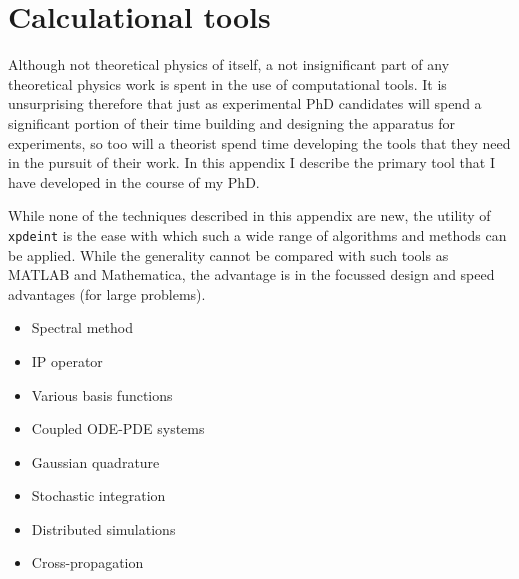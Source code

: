 \chapter{Calculational tools}
\label{ToolsAppendix}
\graphicspath{{Figures/ToolsAppendix/}{Figures/Common/}}


Although not theoretical physics of itself, a not insignificant part of any theoretical physics work is spent in the use of computational tools. It is unsurprising therefore that just as experimental PhD candidates will spend a significant portion of their time building and designing the apparatus for experiments, so too will a theorist spend time developing the tools that they need in the pursuit of their work. In this appendix I describe the primary tool that I have developed in the course of my PhD. %

While none of the techniques described in this appendix are new, the utility of \texttt{xpdeint} is the ease with which such a wide range of algorithms and methods can be applied. While the generality cannot be compared with such tools as MATLAB and Mathematica, the advantage is in the focussed design and speed advantages (for large problems).

\begin{itemize}
    \item Spectral method
    \item IP operator
    \item Various basis functions
    \item Coupled ODE-PDE systems
    \item Gaussian quadrature
    \item Stochastic integration
    \item Distributed simulations
    \item Cross-propagation
\end{itemize}